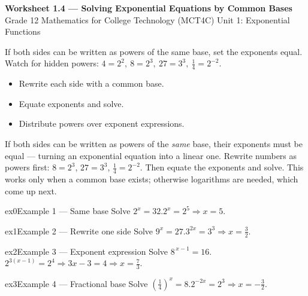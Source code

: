 \documentclass[11pt]{article}
\begin{document}
\begin{center}
{\LARGE\bfseries\color{titleblue}Worksheet 1.4 --- Solving Exponential Equations by Common Bases}\\[2pt]
{\small Grade 12 Mathematics for College Technology (MCT4C) \textperiodcentered{} Unit 1: Exponential Functions}
\end{center}

\begin{ideabox}
If both sides can be written as powers of the same base, set the exponents equal. Watch for hidden powers: $4=2^2,\ 8=2^3,\ 27=3^3,\ \tfrac14=2^{-2}$.
\begin{itemize}[leftmargin=*,itemsep=2pt]
  \item Rewrite each side with a common base.
  \item Equate exponents and solve.
  \item Distribute powers over exponent expressions.
\end{itemize}
\end{ideabox}

\begin{learnbox}
If both sides can be written as powers of the \emph{same} base, their exponents must be equal — turning an exponential equation into a linear one.
Rewrite numbers as powers first: $8=2^3$, $27=3^3$, $\tfrac14=2^{-2}$. Then equate the exponents and solve.
This works only when a common base exists; otherwise logarithms are needed, which come up next.
\end{learnbox}


\begin{example}{ex0}{Example 1 --- Same base}
Solve $2^{x}=32$.\soln $2^x=2^5\Rightarrow x=5$.
\end{example}

\begin{example}{ex1}{Example 2 --- Rewrite one side}
Solve $9^{x}=27$.\soln $3^{2x}=3^3\Rightarrow x=\tfrac32$.
\end{example}

\begin{example}{ex2}{Example 3 --- Exponent expression}
Solve $8^{\,x-1}=16$.\soln $2^{3(x-1)}=2^4\Rightarrow 3x-3=4\Rightarrow x=\tfrac73$.
\end{example}

\begin{example}{ex3}{Example 4 --- Fractional base}
Solve $\left(\tfrac14\right)^{x}=8$.\soln $2^{-2x}=2^3\Rightarrow x=-\tfrac32$.
\end{example}
\end{document}
